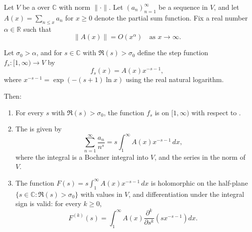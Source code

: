 \begin{theorem} \label{theorem:vector_valued_dirichlet_series_as_mellin_bochner_integral_into_banach_space}
    Let $V$ be a  over $\mathbb{C}$ with norm $\|\cdot\|$. Let $(a_n)_{n=1}^\infty$ be a sequence in $V$, and let $A(x) = \sum_{n \le x} a_n$ for $x \ge 0$ denote the partial sum function. Fix a real number $\alpha \in \mathbb{R}$ such that
    $$\|A(x)\| = O(x^{\alpha}) \quad \text{as } x \to \infty.$$

    Let $\sigma_0 > \alpha$, and for $s \in \mathbb{C}$ with $\Re(s) > \sigma_0$ define the step function $f_s : [1, \infty) \to V$ by
    $$f_s(x) = A(x) x^{-s-1},$$
    where $x^{-s-1} = \exp(-(s+1)\ln x)$ using the real natural logarithm.

    Then:
    \begin{enumerate}
        \item For every $s$ with $\Re(s) > \sigma_0$, the function $f_s$ is  on $[1, \infty)$ with respect to .
        \item The  is given by
        $$\sum_{n=1}^\infty \frac{a_n}{n^s} = s \int_1^\infty A(x) x^{-s-1} \, dx,$$
        where the integral is a Bochner integral into $V$, and the series  in the norm of $V$.
        \item The function $F(s) = s \int_1^\infty A(x) x^{-s-1} \, dx$ is holomorphic on the half-plane $\{ s \in \mathbb{C} : \Re(s) > \sigma_0 \}$ with values in $V$, and differentiation under the integral sign is valid: for every $k \ge 0$,
        $$F^{(k)}(s) = \int_1^\infty A(x) \frac{\partial^k}{\partial s^k} \left( s x^{-s-1} \right) dx.$$
    \end{enumerate}
\end{theorem}
